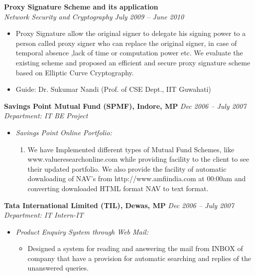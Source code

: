 \documentclass[margin,line]{resume}
\begin{document}
\begin{resume}
    \textbf{Proxy Signature Scheme and its application}\vspace{0mm}\\\vspace{0mm}%
    \textsl{Network Security and Cryptography}  \hfill \textsl{July 2009 -- June 2010}
       \begin{itemize}
	\item Proxy Signature allow the original signer to delegate his signing power to a person 
         called proxy signer  who can replace the original signer, in case of temporal absence ,lack of time or computation power etc.
        We evaluate the existing scheme and proposed an efficient and secure proxy signature scheme based on Elliptic Curve 
        Cryptography. 
	\item Guide: Dr. Sukumar Nandi (Prof. of CSE Dept., IIT Guwahati)
       \end{itemize}

 \textbf{Savings Point Mutual Fund (SPMF), Indore, MP} \hfill \textsl{Dec 2006 -- July 2007}\vspace{0mm}\\\vspace{0mm}%
    \textsl{Department: IT} \hfill \textsl{BE Project}
     \begin{itemize}
     \item \textsl{Savings Point Online Portfolio:} 
            \begin{enumerate}
                \item We have Implemented different types of Mutual Fund Schemes,
   like www.valueresearchonline.com 
  while providing facility to the client to see their updated portfolio. We also provide the facility of automatic downloading of NAV’s from http://www.amfiindia.com at 00:00am and 
        converting downloaded HTML format NAV to text format.
           \end{enumerate}

      \end{itemize}
      
    \textbf{Tata International Limited (TIL), Dewas, MP} \hfill \textsl{Dec 2006 -- July 2007}\vspace{0mm}\\\vspace{0mm}%
    \textsl{Department: IT} \hfill \textsl{Intern-IT}
     \begin{itemize}
     \item \textsl{Product Enquiry System through Web Mail:} 
            \begin{itemize}
             \item Designed a system for reading and answering the mail from INBOX of company that have a provision for automatic searching and replies of the unanswered queries.
	      \end{itemize}
     \end{itemize}


\end{resume}
\end{document}
